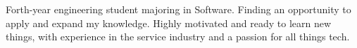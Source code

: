 \documentclass[9pt]{developercv} %
\begin{document}
\vspace{0.5cm}



\begin{minipage}[t]{0.4\textwidth} %
	\vspace{-\baselineskip} %

	Forth-year engineering student majoring in Software. Finding an opportunity to apply and expand my knowledge. Highly motivated and ready to learn new things, with experience in the service industry and a passion for all things tech. %
\end{minipage}
\hfill %
\begin{minipage}[t]{0.5\textwidth} %
	\vspace{-\baselineskip} %
	\begin{barchart}{5.5}
	\end{barchart}
\end{minipage}

\begin{center}
\end{center}


\end{document}
